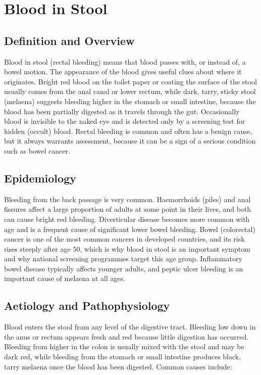 \chapter{Blood in Stool}

\section*{Definition and Overview}
Blood in stool (rectal bleeding) means that blood passes with, or instead of, a bowel motion. The appearance of the blood gives useful clues about where it originates. Bright red blood on the toilet paper or coating the surface of the stool usually comes from the anal canal or lower rectum, while dark, tarry, sticky stool (melaena) suggests bleeding higher in the stomach or small intestine, because the blood has been partially digested as it travels through the gut. Occasionally blood is invisible to the naked eye and is detected only by a screening test for hidden (occult) blood. Rectal bleeding is common and often has a benign cause, but it always warrants assessment, because it can be a sign of a serious condition such as bowel cancer.

\section*{Epidemiology}
Bleeding from the back passage is very common. Haemorrhoids (piles) and anal fissures affect a large proportion of adults at some point in their lives, and both can cause bright red bleeding. Diverticular disease becomes more common with age and is a frequent cause of significant lower bowel bleeding. Bowel (colorectal) cancer is one of the most common cancers in developed countries, and its risk rises steeply after age 50, which is why blood in stool is an important symptom and why national screening programmes target this age group. Inflammatory bowel disease typically affects younger adults, and peptic ulcer bleeding is an important cause of melaena at all ages.

\section*{Aetiology and Pathophysiology}
Blood enters the stool from any level of the digestive tract. Bleeding low down in the anus or rectum appears fresh and red because little digestion has occurred. Bleeding from higher in the colon is usually mixed with the stool and may be dark red, while bleeding from the stomach or small intestine produces black, tarry melaena once the blood has been digested. Common causes include:

